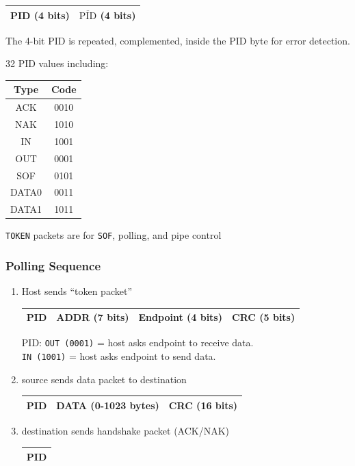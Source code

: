 \documentclass{article}	%
\begin{document}
\begin{tabular}{|c|c| }
\hline
PID (4 bits) & $\overline{\mathrm {PID}}$ (4 bits)\\
\hline
\end{tabular}


The 4-bit PID is repeated, complemented, inside the PID
byte for error detection.

32 PID values including: \hspace{0.25in}
\begin{tabular}{|c|c|}
\hline
Type	& Code \\ \hline
ACK	& 0010 \\ \hline
NAK	& 1010 \\ \hline
IN	& 1001 \\ \hline
OUT	& 0001 \\ \hline
SOF	& 0101 \\ \hline
DATA0	& 0011 \\ \hline
DATA1	& 1011 \\ \hline
\end{tabular}

{\tt TOKEN} packets are for {\tt SOF}, polling,  and pipe control

\subsubsection{Polling Sequence}

\begin{enumerate}
     \item Host sends ``token packet''  \\
     \begin{tabular}{|c|c|c|c|}
       \hline
        PID  &  ADDR (7 bits)  & Endpoint (4 bits) & CRC (5 bits)\\
       \hline
     \end{tabular}

     PID: {\tt OUT (0001)} = host asks endpoint to receive data.\\
     {\tt IN (1001)} = host asks endpoint to send data.

     \item source sends data packet to destination\\
     \begin{tabular}{|c|c|c|}
       \hline
        PID  & DATA (0-1023 bytes)  &  CRC (16 bits)\\
       \hline
     \end{tabular}


     \item destination sends handshake packet (ACK/NAK) \\
    \begin{tabular}{|c|}
       \hline
        PID  \\
       \hline
     \end{tabular}

\end{enumerate}
\end{document}
